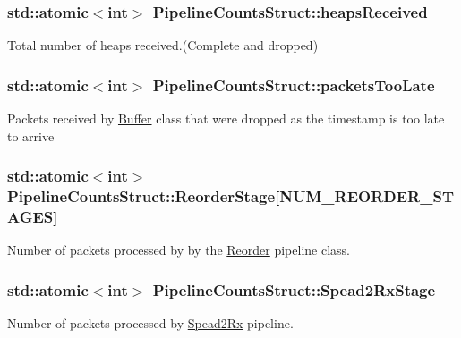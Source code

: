 \subsubsection[{\texorpdfstring{heaps\+Received}{heapsReceived}}]{\setlength{\rightskip}{0pt plus 5cm}std\+::atomic$<$int$>$ Pipeline\+Counts\+Struct\+::heaps\+Received}\hypertarget{struct_pipeline_counts_struct_ab566310da0d343755e2609dd87942297}{}\label{struct_pipeline_counts_struct_ab566310da0d343755e2609dd87942297}
Total number of heaps received.(Complete and dropped) 
\subsubsection[{\texorpdfstring{packets\+Too\+Late}{packetsTooLate}}]{\setlength{\rightskip}{0pt plus 5cm}std\+::atomic$<$int$>$ Pipeline\+Counts\+Struct\+::packets\+Too\+Late}\hypertarget{struct_pipeline_counts_struct_a20f49082e3e3a14a26a6d47e1118afe6}{}\label{struct_pipeline_counts_struct_a20f49082e3e3a14a26a6d47e1118afe6}
Packets received by \hyperlink{class_buffer}{Buffer} class that were dropped as the timestamp is too late to arrive 
\subsubsection[{\texorpdfstring{Reorder\+Stage}{ReorderStage}}]{\setlength{\rightskip}{0pt plus 5cm}std\+::atomic$<$int$>$ Pipeline\+Counts\+Struct\+::\+Reorder\+Stage\mbox{[}{\bf N\+U\+M\+\_\+\+R\+E\+O\+R\+D\+E\+R\+\_\+\+S\+T\+A\+G\+ES}\mbox{]}}\hypertarget{struct_pipeline_counts_struct_a4561cd0dd5f2be78e2ca3b775323bf98}{}\label{struct_pipeline_counts_struct_a4561cd0dd5f2be78e2ca3b775323bf98}
Number of packets processed by by the \hyperlink{class_reorder}{Reorder} pipeline class. 
\subsubsection[{\texorpdfstring{Spead2\+Rx\+Stage}{Spead2RxStage}}]{\setlength{\rightskip}{0pt plus 5cm}std\+::atomic$<$int$>$ Pipeline\+Counts\+Struct\+::\+Spead2\+Rx\+Stage}\hypertarget{struct_pipeline_counts_struct_a82ae1fa7ae44646e7d76f52f46d53d51}{}\label{struct_pipeline_counts_struct_a82ae1fa7ae44646e7d76f52f46d53d51}
Number of packets processed by \hyperlink{class_spead2_rx}{Spead2\+Rx} pipeline. 

